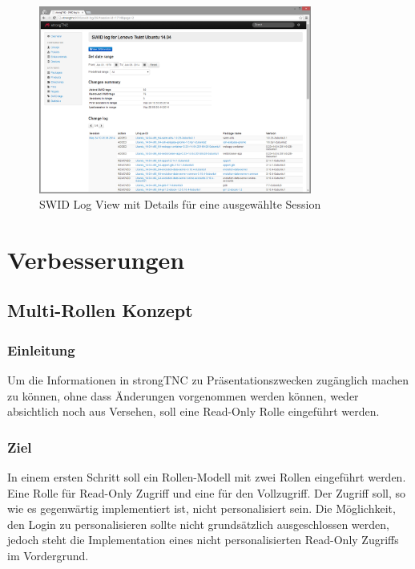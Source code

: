 \begin{figure}[H]
\centering
\includegraphics[width=0.8\textwidth]{./images/Views/log-view}
\caption{SWID Log View mit Details für eine ausgewählte Session}
\label{fig:log-view}
\end{figure}


\section{Verbesserungen}

\subsection{Multi-Rollen Konzept}

\subsubsection{Einleitung}

Um die Informationen in strongTNC zu Präsentationszwecken zugänglich machen zu können, 
ohne dass Änderungen vorgenommen werden können, weder absichtlich noch aus Versehen, 
soll eine Read-Only Rolle eingeführt werden.


\subsubsection{Ziel}
In einem ersten Schritt soll ein Rollen-Modell mit zwei Rollen eingeführt werden. 
Eine Rolle für Read-Only Zugriff und eine für den Vollzugriff. Der Zugriff soll, 
so wie es gegenwärtig implementiert ist, nicht personalisiert sein. Die Möglichkeit, 
den Login zu personalisieren sollte nicht grundsätzlich ausgeschlossen werden, jedoch 
steht die Implementation eines nicht personalisierten Read-Only Zugriffs im Vordergrund.


